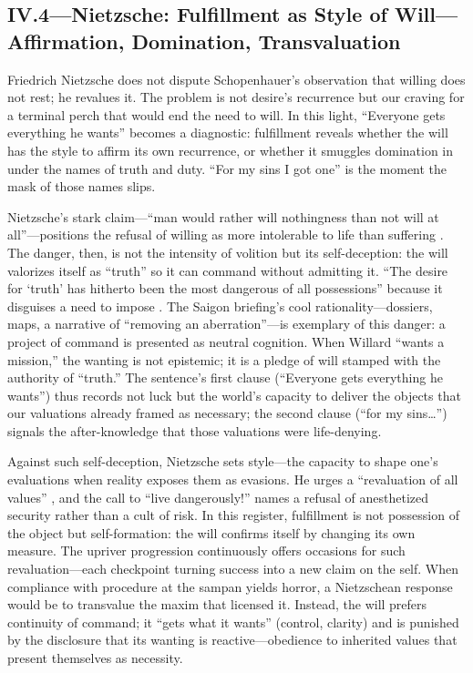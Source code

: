 \subsection*{IV.4—Nietzsche: Fulfillment as Style of Will—Affirmation, Domination, Transvaluation}
\label{ssec:iii-nietzsche}
Friedrich Nietzsche does not dispute Schopenhauer's observation that willing does not rest; he
revalues it. The problem is not desire's recurrence but our craving for a terminal perch that
would end
the need to will. In this light, ``Everyone gets everything he wants'' becomes a diagnostic:
fulfillment reveals whether the will has the style to affirm its own recurrence, or whether it
smuggles domination in under the names of truth and duty. ``For my sins I got one'' is the
moment the mask of those names slips.

Nietzsche's stark claim—``man would rather will nothingness than not will at all''—positions
the refusal of willing as more intolerable to life than suffering
\parencite[III.28, p.~162]{NietzscheGenealogy1994}. The danger, then, is not the intensity of
volition but its self-deception: the will valorizes itself as ``truth'' so it can command
without admitting it. ``The desire for `truth' has hitherto been the most dangerous of all
possessions'' because it disguises a need to impose \parencite[\S 34]{NietzscheBGE1990}.
The Saigon briefing's cool rationality—dossiers, maps, a narrative of ``removing an
aberration''—is exemplary of this danger: a project of command is presented as neutral cognition.
When Willard ``wants a mission,'' the wanting is not epistemic; it is a pledge of will stamped
with the authority of ``truth.'' The sentence's first clause (``Everyone gets everything he
wants'') thus records not luck but the world's capacity to deliver the objects that our
valuations already framed as necessary; the second clause (``for my sins\ldots'') signals
the after-knowledge that those valuations were life-denying.

Against such self-deception, Nietzsche sets style—the capacity to shape one's evaluations when
reality exposes them as evasions. He urges a ``revaluation of all values''
\parencite[\S\S 203--211]{NietzscheBGE1990}, and the call to ``live dangerously!''
\parencite[\S 283]{NietzscheBGE1990} names a refusal of anesthetized security rather than a
cult of risk. In this register, fulfillment is not possession of the object but self-formation:
the will confirms itself by changing its own measure. The upriver progression continuously
offers occasions for such revaluation—each checkpoint turning success into a new claim on the
self. When compliance with procedure at the sampan yields horror, a Nietzschean response would
be to transvalue the maxim that licensed it. Instead, the will prefers continuity of command;
it ``gets what it wants'' (control, clarity) and is punished by the disclosure that its wanting
is reactive—obedience to inherited values that present themselves as necessity.

